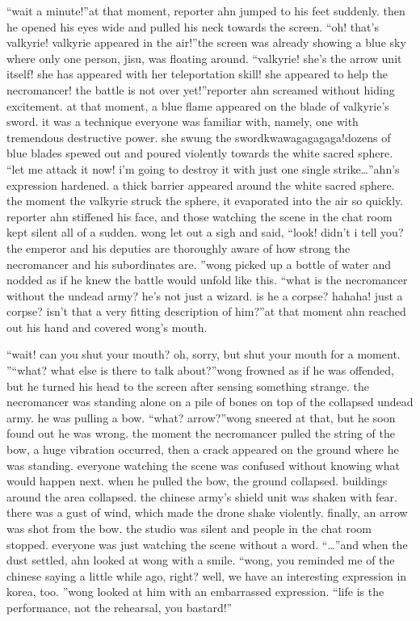 “wait a minute!”at that moment, reporter ahn jumped to his feet suddenly.
 then he opened his eyes wide and pulled his neck towards the screen.
“oh! that’s valkyrie! valkyrie appeared in the air!”the screen was already showing a blue sky where only one person, jisu, was floating around.
“valkyrie! she’s the arrow unit itself! she has appeared with her teleportation skill! she appeared to help the necromancer! the battle is not over yet!”reporter ahn screamed without hiding excitement.
at that moment, a blue flame appeared on the blade of valkyrie’s sword.
 it was a technique everyone was familiar with, namely, one with tremendous destructive power.
she swung the swordkwawagagagaga!dozens of blue blades spewed out and poured violently towards the white sacred sphere.
“let me attack it now! i’m going to destroy it with just one single strike…”ahn’s expression hardened.
 a thick barrier appeared around the white sacred sphere.
the moment the valkyrie struck the sphere, it evaporated into the air so quickly.
reporter ahn stiffened his face, and those watching the scene in the chat room kept silent all of a sudden.
wong let out a sigh and said, “look! didn’t i tell you? the emperor and his deputies are thoroughly aware of how strong the necromancer and his subordinates are.
”wong picked up a bottle of water and nodded as if he knew the battle would unfold like this.
“what is the necromancer without the undead army? he’s not just a wizard.
 is he a corpse? hahaha! just a corpse? isn’t that a very fitting description of him?”at that moment ahn reached out his hand and covered wong’s mouth.


“wait! can you shut your mouth? oh, sorry, but shut your mouth for a moment.
”“what? what else is there to talk about?”wong frowned as if he was offended, but he turned his head to the screen after sensing something strange.
the necromancer was standing alone on a pile of bones on top of the collapsed undead army.
he was pulling a bow.
“what? arrow?”wong sneered at that, but he soon found out he was wrong.
the moment the necromancer pulled the string of the bow, a huge vibration occurred, then a crack appeared on the ground where he was standing.
everyone watching the scene was confused without knowing what would happen next.
when he pulled the bow, the ground collapsed.
 buildings around the area collapsed.
the chinese army’s shield unit was shaken with fear.
 there was a gust of wind, which made the drone shake violently.
 finally, an arrow was shot from the bow.
the studio was silent and people in the chat room stopped.
everyone was just watching the scene without a word.
“…”and when the dust settled, ahn looked at wong with a smile.
“wong, you reminded me of the chinese saying a little while ago, right? well, we have an interesting expression in korea, too.
”wong looked at him with an embarrassed expression.
“life is the performance, not the rehearsal, you bastard!”

 
